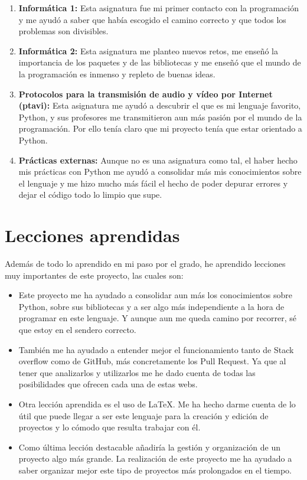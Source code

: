 \documentclass[a4paper, 12pt]{book}
\begin{document}
\begin{enumerate}
  \item \textbf{Informática 1:} Esta asignatura fue mi primer contacto con la programación y me ayudó a saber que había escogido el camino correcto y que todos los problemas son divisibles.
  \item \textbf{Informática 2:} Esta asignatura me planteo nuevos retos, me enseñó la importancia de los paquetes y de las bibliotecas y me enseñó que el mundo de la programación es inmenso y repleto de buenas ideas.
  \item \textbf{Protocolos para la transmisión de audio y vídeo por Internet (ptavi):} Esta asignatura me ayudó a descubrir el que es mi lenguaje favorito, Python, y sus profesores me transmitieron aun más pasión por el mundo de la programación. Por ello tenía claro que mi proyecto tenía que estar orientado a Python.
  \item \textbf{Prácticas externas:} Aunque no es una asignatura como tal, el haber hecho mis prácticas con Python me ayudó a consolidar más mis conocimientos sobre el lenguaje y me hizo mucho más fácil el hecho de poder depurar errores y dejar el código todo lo limpio que supe.
\end{enumerate}


\section{Lecciones aprendidas}
\label{sec:lecciones_aprendidas}

Además de todo lo aprendido en mi paso por el grado, he aprendido lecciones muy importantes de este proyecto, las cuales son:

\begin{itemize}
	\item Este proyecto me ha ayudado a consolidar aun más los conocimientos sobre Python, sobre sus bibliotecas y a ser algo más independiente a la hora de programar en este lenguaje. Y aunque aun me queda camino por recorrer, sé que estoy en el sendero correcto.
	\item También me ha ayudado a entender mejor el funcionamiento tanto de Stack overflow como de GitHub, más concretamente los Pull Request. Ya que al tener que analizarlos y utilizarlos me he dado cuenta de todas las posibilidades que ofrecen cada una de estas webs.
	\item Otra lección aprendida es el uso de \LaTeX. Me ha hecho darme cuenta de lo útil que puede llegar a ser este lenguaje para la creación y edición de proyectos y lo cómodo que resulta trabajar con él.
	\item Como última lección destacable añadiría la gestión y organización de un proyecto algo más grande. La realización de este proyecto me ha ayudado a saber organizar mejor este tipo de proyectos más prolongados en el tiempo. 
\end{itemize}
\end{document}
